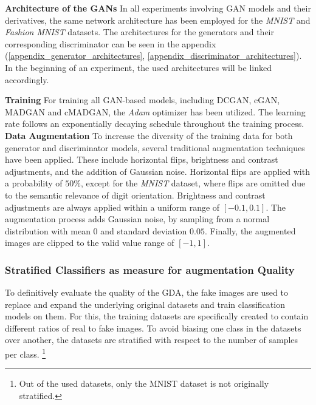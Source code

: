 \noindent\textbf{Architecture of the GANs}
In all experiments involving GAN models and their derivatives, the same network architecture has been employed for the \textit{MNIST} and \textit{Fashion MNIST} datasets. The architectures for the generators and their corresponding discriminator can be seen in the appendix (\ref{appendix_generator_architectures}, \ref{appendix_discriminator_architectures}). In the beginning of an experiment, the used architectures will be linked accordingly.

\noindent\textbf{Training}
For training all GAN-based models, including DCGAN, cGAN, MADGAN and cMADGAN, the \textit{Adam} optimizer has been utilized. The learning rate follows an exponentially decaying schedule throughout the training process.\\

\noindent\textbf{Data Augmentation}\label{body_experiment_dataaugmentation}
To increase the diversity of the training data for both generator and discriminator models, several traditional augmentation techniques have been applied. These include horizontal flips, brightness and contrast adjustments, and the addition of Gaussian noise.
Horizontal flips are applied with a probability of \(50\%\), except for the \textit{MNIST} dataset, where flips are omitted due to the semantic relevance of digit orientation. Brightness and contrast adjustments are always applied within a uniform range of \([-0.1, 0.1]\). The augmentation process adds Gaussian noise, by sampling from a normal distribution with mean \(0\) and standard deviation \(0.05\). Finally, the augmented images are clipped to the valid value range of \([-1, 1]\).

\subsubsection{Stratified Classifiers as measure for augmentation Quality}
To definitively evaluate the quality of the GDA, the fake images are used to replace and expand the underlying original datasets and train classification models on them. For this, the training datasets are specifically created to contain different ratios of real to fake images. To avoid biasing one class in the datasets over another, the datasets are stratified with respect to the number of samples per class. \footnote{Out of the used datasets, only the MNIST dataset is not originally stratified.}

